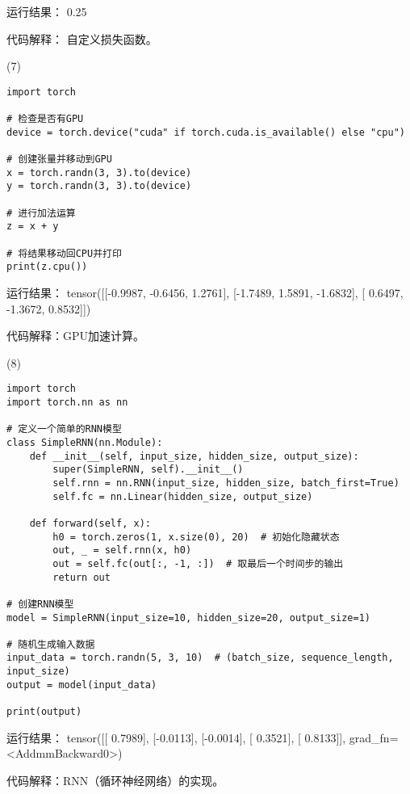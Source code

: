 \documentclass[a4paper, 12pt]{article}
\begin{document}
{\color{blue}
运行结果：
0.25
}

代码解释： 自定义损失函数。

(7)
\begin{verbatim}
import torch

# 检查是否有GPU
device = torch.device("cuda" if torch.cuda.is_available() else "cpu")

# 创建张量并移动到GPU
x = torch.randn(3, 3).to(device)
y = torch.randn(3, 3).to(device)

# 进行加法运算
z = x + y

# 将结果移动回CPU并打印
print(z.cpu())
\end{verbatim}

{\color{blue}
运行结果：
tensor([[-0.9987, -0.6456,  1.2761],
        [-1.7489,  1.5891, -1.6832],
        [ 0.6497, -1.3672,  0.8532]])
}

代码解释：GPU加速计算。

(8)
\begin{verbatim}
import torch
import torch.nn as nn

# 定义一个简单的RNN模型
class SimpleRNN(nn.Module):
    def __init__(self, input_size, hidden_size, output_size):
        super(SimpleRNN, self).__init__()
        self.rnn = nn.RNN(input_size, hidden_size, batch_first=True)
        self.fc = nn.Linear(hidden_size, output_size)

    def forward(self, x):
        h0 = torch.zeros(1, x.size(0), 20)  # 初始化隐藏状态
        out, _ = self.rnn(x, h0)
        out = self.fc(out[:, -1, :])  # 取最后一个时间步的输出
        return out

# 创建RNN模型
model = SimpleRNN(input_size=10, hidden_size=20, output_size=1)

# 随机生成输入数据
input_data = torch.randn(5, 3, 10)  # (batch_size, sequence_length, input_size)
output = model(input_data)

print(output)
\end{verbatim}

{\color{blue}
运行结果：
tensor([[ 0.7989],
        [-0.0113],
        [-0.0014],
        [ 0.3521],
        [ 0.8133]], grad\_fn=<AddmmBackward0>)
}

代码解释：RNN（循环神经网络）的实现。
\end{document}
